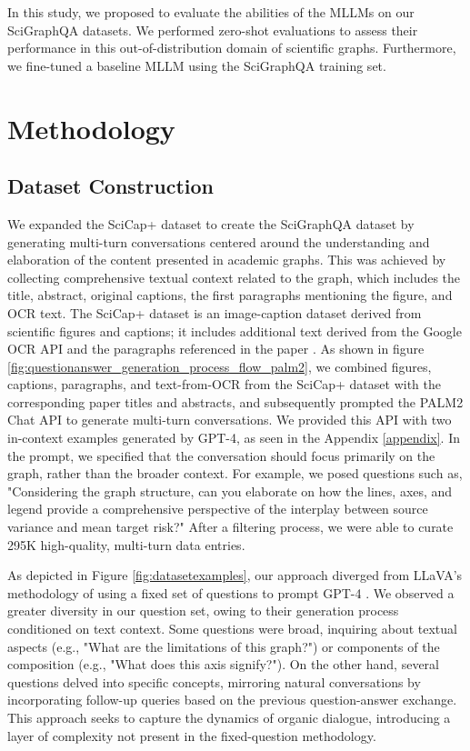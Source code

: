 \documentclass{article}
\begin{document}
In this study, we proposed to evaluate the abilities of the MLLMs on our SciGraphQA datasets. We performed zero-shot evaluations to assess their performance in this out-of-distribution domain of scientific graphs. Furthermore, we fine-tuned a baseline MLLM using the SciGraphQA training set.
\section{Methodology}
\subsection{Dataset Construction}
We expanded the SciCap+ dataset to create the SciGraphQA dataset by generating multi-turn conversations centered around the understanding and elaboration of the content presented in academic graphs. This was achieved by collecting comprehensive textual context related to the graph, which includes the title, abstract, original captions, the first paragraphs mentioning the figure, and OCR text. The SciCap+ dataset is an image-caption dataset derived from scientific figures and captions; it includes additional text derived from the Google OCR API and the paragraphs referenced in the paper \cite{yang2023scicap+}. As shown in figure \ref{fig:questionanswer_generation_process_flow_palm2}, we combined figures, captions, paragraphs, and text-from-OCR from the SciCap+ dataset with the corresponding paper titles and abstracts, and subsequently prompted the PALM2 Chat API to generate multi-turn conversations. We provided this API with two in-context examples generated by GPT-4, as seen in the Appendix \ref{appendix}. In the prompt, we specified that the conversation should focus primarily on the graph, rather than the broader context. For example, we posed questions such as, "Considering the graph structure, can you elaborate on how the lines, axes, and legend provide a comprehensive perspective of the interplay between source variance and mean target risk?" After a filtering process, we were able to curate 295K high-quality, multi-turn data entries. 

As depicted in Figure \ref{fig:datasetexamples}, our approach diverged from LLaVA's methodology of using a fixed set of questions to prompt GPT-4 \cite{liu2023}. We observed a greater diversity in our question set, owing to their generation process conditioned on text context. Some questions were broad, inquiring about textual aspects (e.g., "What are the limitations of this graph?") or components of the composition (e.g., "What does this axis signify?"). On the other hand, several questions delved into specific concepts, mirroring natural conversations by incorporating follow-up queries based on the previous question-answer exchange. This approach seeks to capture the dynamics of organic dialogue, introducing a layer of complexity not present in the fixed-question methodology.
\end{document}
